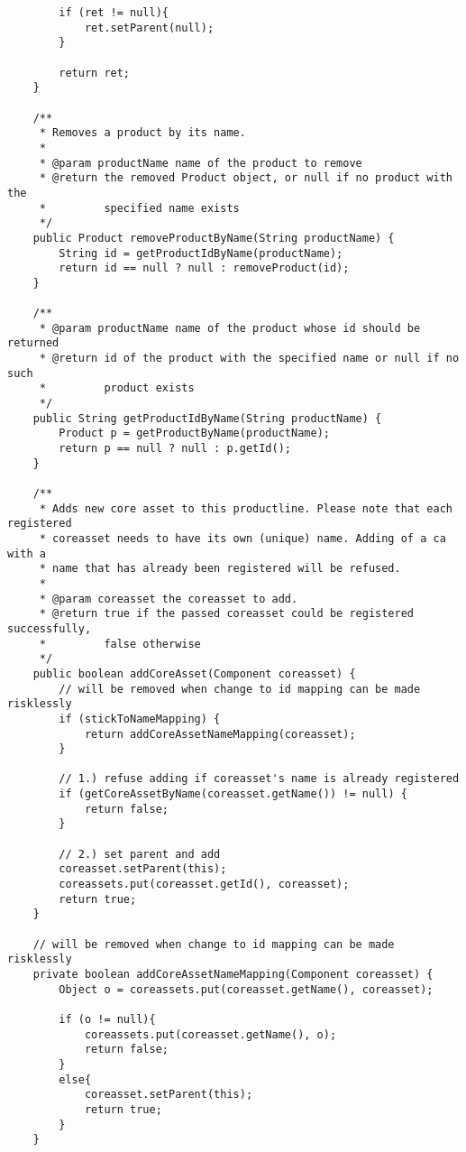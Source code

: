 \begin{verbatim}
        if (ret != null){
        	ret.setParent(null);
        }
        
        return ret;
	}
    
    /**
     * Removes a product by its name.
     * 
     * @param productName name of the product to remove
     * @return the removed Product object, or null if no product with the 
     *         specified name exists
     */
    public Product removeProductByName(String productName) {
        String id = getProductIdByName(productName);
        return id == null ? null : removeProduct(id);
    }
    
    /**
     * @param productName name of the product whose id should be returned
     * @return id of the product with the specified name or null if no such
     *         product exists
     */
    public String getProductIdByName(String productName) {
        Product p = getProductByName(productName);
        return p == null ? null : p.getId();
    }

	/**
	 * Adds new core asset to this productline. Please note that each registered
     * coreasset needs to have its own (unique) name. Adding of a ca with a
     * name that has already been registered will be refused. 
     * 
	 * @param coreasset the coreasset to add.
     * @return true if the passed coreasset could be registered successfully,
     *         false otherwise
	 */
	public boolean addCoreAsset(Component coreasset) {
        // will be removed when change to id mapping can be made risklessly
        if (stickToNameMapping) {
            return addCoreAssetNameMapping(coreasset);
        }
        
        // 1.) refuse adding if coreasset's name is already registered
        if (getCoreAssetByName(coreasset.getName()) != null) {
            return false;
        }
        
        // 2.) set parent and add
        coreasset.setParent(this);
        coreassets.put(coreasset.getId(), coreasset);
        return true;
	}
    
    // will be removed when change to id mapping can be made risklessly
    private boolean addCoreAssetNameMapping(Component coreasset) {
        Object o = coreassets.put(coreasset.getName(), coreasset);
        
        if (o != null){
            coreassets.put(coreasset.getName(), o);
            return false;
        }
        else{
            coreasset.setParent(this);
            return true;
        }
    }
	

\end{verbatim}
